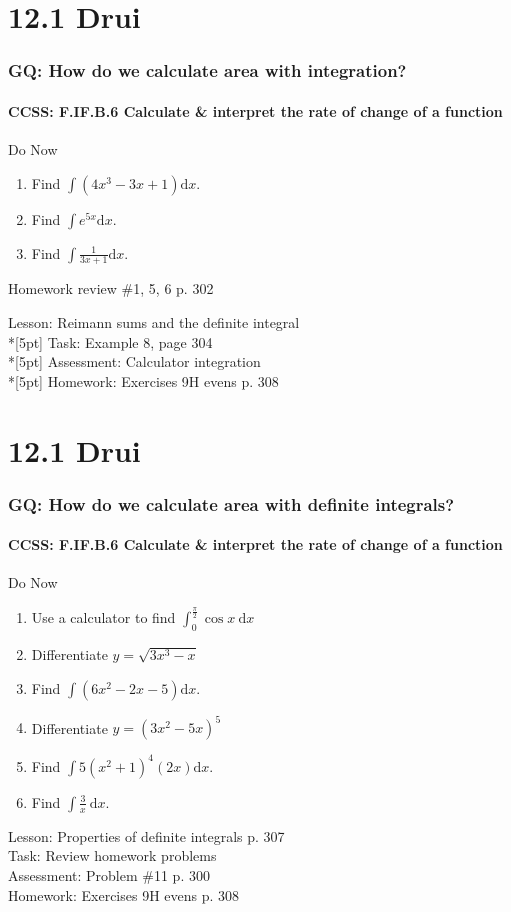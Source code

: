 \documentclass{beamer}
\begin{document}
  \section{12.1 Drui}
  \frame
  {
    \frametitle{GQ: How do we calculate area with integration?}
    \framesubtitle{CCSS: F.IF.B.6 Calculate \& interpret the rate of change of a function}

    \begin{block}{Do Now}
    \begin{enumerate}
        \item Find $\int{(4x^3-3x+1)}\mathrm{d}x$.
        \item Find $\int e^{5x}\mathrm{d}x$.
        \item Find $\displaystyle \int \frac{1}{3x+1} \mathrm{d}x$.
    \end{enumerate}
    Homework review \#1, 5, 6 p. 302
    \end{block}
    Lesson: Reimann sums and the definite integral\\*[5pt]
    Task: Example 8, page 304\\*[5pt]
    Assessment: Calculator integration \\*[5pt]
    Homework: Exercises 9H evens p. 308
  }

  \section{12.1 Drui}
  \frame
  {
    \frametitle{GQ: How do we calculate area with definite integrals?}
    \framesubtitle{CCSS: F.IF.B.6 Calculate \& interpret the rate of change of a function}

    \begin{block}{Do Now}
    \begin{enumerate}
        \item Use a calculator to find $\displaystyle \int_0^{\frac{\pi}{2}}{\cos x}\ \mathrm{d}x$
        \item Differentiate $y=\sqrt{3x^3-x}$
        \item Find $\int{(6x^2-2x-5)}\mathrm{d}x$.
        \item Differentiate $y={(3x^2-5x)^5}$
        \item Find $\int 5(x^2+1)^4(2x)\mathrm{d}x$.
        \item Find $\displaystyle \int \frac{3}{x}\ \mathrm{d}x$.
    \end{enumerate}
    \end{block}
    Lesson: Properties of definite integrals p. 307\\%
    Task: Review homework problems\\%
    Assessment: Problem \#11 p. 300 \\%
    Homework: Exercises 9H evens p. 308
  }
\end{document}
